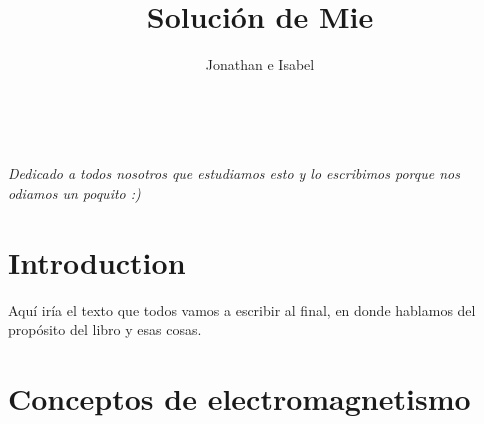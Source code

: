 \documentclass[12pts,a4paper]{book}
\title{Solución de Mie}
\author{Jonathan e Isabel}
\begin{document}
\frontmatter

\blankpage

\maketitle



\tableofcontents

\listoffigures

\listoftables

\cleardoublepage
~\vfill
\begin{doublespace}
\noindent\fontsize{18}{22}\selectfont\itshape
\noindent
Dedicado a todos nosotros que estudiamos esto y lo escribimos porque nos odiamos un poquito :)
\end{doublespace}
\vfill
\vfill


\cleardoublepage
\chapter*{Introduction}

Aquí iría el texto que todos vamos a escribir al final, en donde hablamos del propósito del libro y esas cosas.


\mainmatter


\chapter{Conceptos de electromagnetismo}
\label{ch:repasoEM} %




\end{document}
